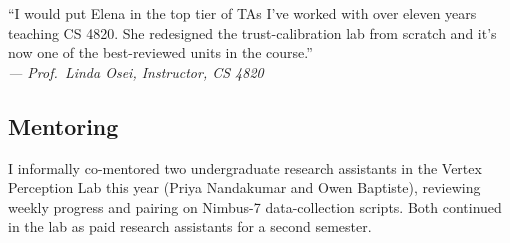 \vspace{6pt}

\begin{quotebox}
``I would put Elena in the top tier of TAs I've worked with over eleven years teaching CS 4820.
She redesigned the trust-calibration lab from scratch and it's now one of the
best-reviewed units in the course.''\\[4pt]
\textit{--- Prof.\ Linda Osei, Instructor, CS 4820}
\end{quotebox}

\subsection{Mentoring}

I informally co-mentored two undergraduate research assistants in the Vertex Perception Lab
this year (Priya Nandakumar and Owen Baptiste), reviewing weekly progress and pairing on
Nimbus-7 data-collection scripts. Both continued in the lab as paid research assistants for a
second semester.
